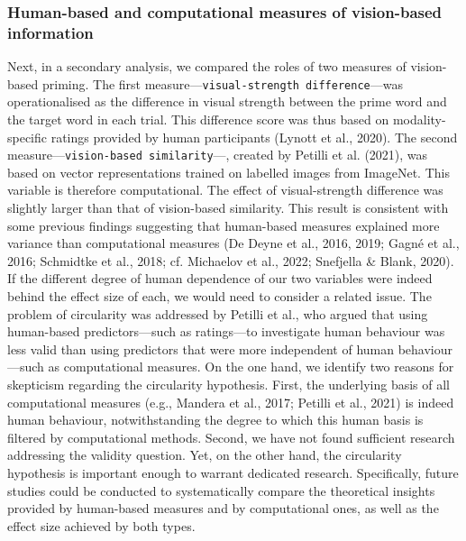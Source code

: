 \documentclass[
  12pt,
  man,floatsintext]{apa7}
\begin{document}
\hypertarget{human-based-and-computational-measures-of-vision-based-information}{%
\subsubsection{Human-based and computational measures of vision-based information}\label{human-based-and-computational-measures-of-vision-based-information}}

Next, in a secondary analysis, we compared the roles of two measures of vision-based priming. The first measure---\texttt{visual-strength\ difference}---was operationalised as the difference in visual strength between the prime word and the target word in each trial. This difference score was thus based on modality-specific ratings provided by human participants (Lynott et al., 2020). The second measure---\texttt{vision-based\ similarity}---, created by Petilli et al. (2021), was based on vector representations trained on labelled images from ImageNet. This variable is therefore computational. The effect of visual-strength difference was slightly larger than that of vision-based similarity. This result is consistent with some previous findings suggesting that human-based measures explained more variance than computational measures (De Deyne et al., 2016, 2019; Gagné et al., 2016; Schmidtke et al., 2018; cf. Michaelov et al., 2022; Snefjella \& Blank, 2020). If the different degree of human dependence of our two variables were indeed behind the effect size of each, we would need to consider a related issue. The problem of circularity was addressed by Petilli et al., who argued that using human-based predictors---such as ratings---to investigate human behaviour was less valid than using predictors that were more independent of human behaviour---such as computational measures. On the one hand, we identify two reasons for skepticism regarding the circularity hypothesis. First, the underlying basis of all computational measures (e.g., Mandera et al., 2017; Petilli et al., 2021) is indeed human behaviour, notwithstanding the degree to which this human basis is filtered by computational methods. Second, we have not found sufficient research addressing the validity question. Yet, on the other hand, the circularity hypothesis is important enough to warrant dedicated research. Specifically, future studies could be conducted to systematically compare the theoretical insights provided by human-based measures and by computational ones, as well as the effect size achieved by both types.
\end{document}

